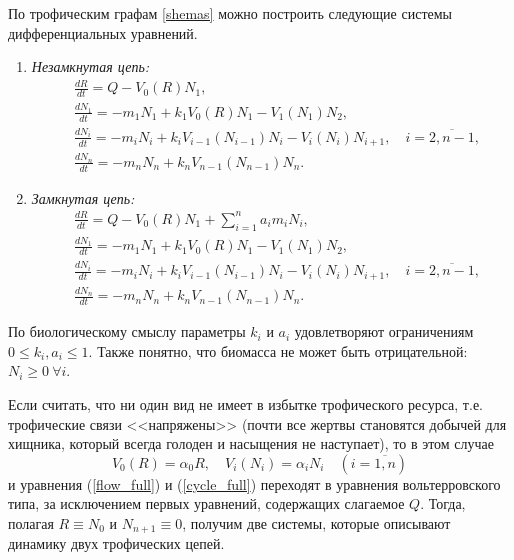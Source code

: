 По трофическим графам \ref{shemas} можно построить следующие системы дифференциальных уравнений. 

\begin{enumerate}[label={\asbuk*)}, ref=\asbuk*]
    \item \textit{Незамкнутая цепь:}
    \begin{equation}  \label{flow_full}
        \begin{split}
            & \frac{dR}{dt} = Q - V_0(R) N_1, \\
            & \frac{dN_1}{dt} = -m_1 N_1 + k_1 V_0(R) N_1 - V_1(N_1) N_2, \\
            & \frac{dN_i}{dt} = -m_i N_i + k_i V_{i-1}(N_{i-1}) N_i - V_i(N_i) N_{i+1}, \quad i=\overline{2,n-1}, \\
            & \frac{dN_n}{dt} = -m_n N_n + k_n V_{n-1}(N_{n-1}) N_n.
        \end{split}
    \end{equation}

    \item \textit{Замкнутая цепь:}
    \begin{equation} \label{cycle_full}
        \begin{split}
            & \frac{dR}{dt} = Q - V_0(R) N_1  + \sum_{i=1}^{n} a_i m_i N_i, \\
            & \frac{dN_1}{dt} = -m_1 N_1 + k_1 V_0(R) N_1 - V_1(N_1) N_2, \\
            & \frac{dN_i}{dt} = -m_i N_i + k_i V_{i-1}(N_{i-1}) N_i - V_i(N_i) N_{i+1}, \quad i=\overline{2,n-1}, \\
            & \frac{dN_n}{dt} = -m_n N_n + k_n V_{n-1}(N_{n-1}) N_n.
        \end{split}
    \end{equation}
\end{enumerate}

По биологическому смыслу параметры $k_i$ и $a_i$ удовлетворяют ограничениям $ 0 \leq k_i, a_i \leq 1 $. Также понятно, что биомасса не может быть отрицательной: \(N_i \geq 0 ~ \forall i\).

Если считать, что ни один вид не имеет в избытке трофического ресурса, т.е. трофические связи <<напряжены>> (почти все жертвы становятся добычей для хищника, который всегда голоден и насыщения не наступает), то в этом случае
\begin{equation}
    V_0(R) = \alpha_0 R, \quad V_i(N_i) = \alpha_i N_i \quad (i=\overline{1,n})
\end{equation}
и уравнения (\ref{flow_full}) и (\ref{cycle_full}) переходят в уравнения вольтерровского типа, за исключением первых уравнений, содержащих слагаемое \(Q\). Тогда, полагая \(R \equiv N_0\) и \( N_{n+1} \equiv 0 \), получим две системы, которые описывают динамику двух трофических цепей.  

